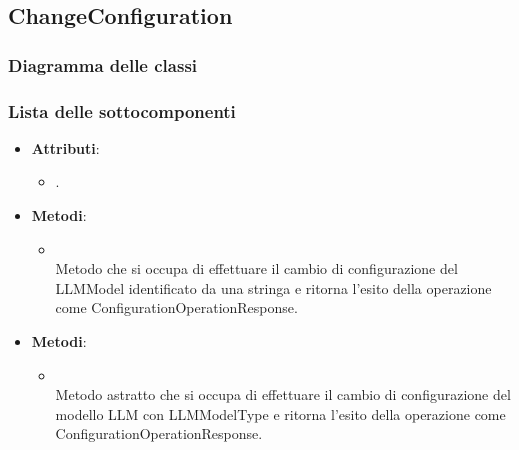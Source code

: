 \documentclass[10pt, a4paper]{article}
\begin{document}
 \subsection{ChangeConfiguration}%
 \subsubsection{Diagramma delle classi}
 \subsubsection{Lista delle sottocomponenti}
 




\label{ChangeConfigurationControllerDettaglio}
\begin{itemize}
    \item \textbf{Attributi}:
    \begin{itemize}
        \item {}.
    \end{itemize}
    \item \textbf{Metodi}:
    \begin{itemize}
        \item {}\\
        Metodo che si occupa di effettuare il cambio di configurazione del LLMModel identificato da una stringa e ritorna l'esito della operazione come ConfigurationOperationResponse.
    \end{itemize}
\end{itemize}

\label{ChangeConfigurationPortDettaglio}
\begin{itemize}
    \item \textbf{Metodi}:
    \begin{itemize}
        \item {}\\
        Metodo astratto che si occupa di effettuare il cambio di configurazione del modello LLM con LLMModelType e ritorna l'esito della operazione come ConfigurationOperationResponse.
    \end{itemize}
\end{itemize}
\end{document}
